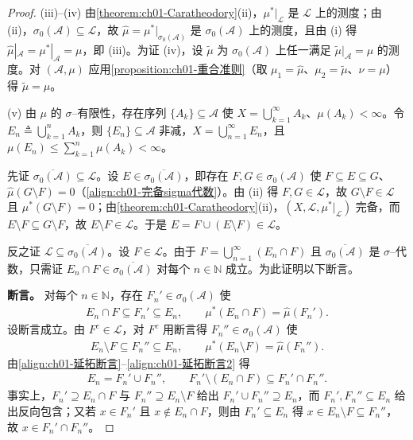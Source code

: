 \documentclass[../../main.tex]{subfiles}%
\begin{document}
\begin{proof}
(iii)--(iv) 由\cref{theorem:ch01-Caratheodory}(ii)，$\mu^*|_{\mathcal{L}}$ 是 $\mathcal{L}$ 上的测度；由 (ii)，$\sigma_0(\mathcal{A})\subseteq\mathcal{L}$，故 $\widehat{\mu}=\mu^*|_{\sigma_0(\mathcal{A})}$ 是 $\sigma_0(\mathcal{A})$ 上的测度，且由 (i) 得 $\widehat{\mu}|_{\mathcal{A}}=\mu^*|_{\mathcal{A}}=\mu$，即 (iii)。为证 (iv)，设 $\widetilde{\mu}$ 为 $\sigma_0(\mathcal{A})$ 上任一满足 $\widetilde{\mu}|_{\mathcal{A}}=\mu$ 的测度。对 $(\mathcal{A},\mu)$ 应用\cref{proposition:ch01-重合准则}（取 $\mu_1=\widehat{\mu}$、$\mu_2=\widetilde{\mu}$、$\nu=\mu$）得 $\widetilde{\mu}=\widehat{\mu}$。

(v) 由 $\mu$ 的 $\sigma$--有限性，存在序列 $\{A_k\}\subseteq\mathcal{A}$ 使 $X=\bigcup_{k=1}^\infty A_k$、$\mu(A_k)<\infty$。令 $E_n\triangleq\bigcup_{k=1}^n A_k$，则 $\{E_n\}\subseteq\mathcal{A}$ 非减，$X=\bigcup_{n=1}^\infty E_n$，且 $\mu(E_n)\leqslant\sum_{k=1}^n\mu(A_k)<\infty$。

先证 $\overline{\sigma_0(\mathcal{A})}\subseteq\mathcal{L}$。设 $E\in\overline{\sigma_0(\mathcal{A})}$，即存在 $F,G\in\sigma_0(\mathcal{A})$ 使 $F\subseteq E\subseteq G$、$\widehat{\mu}(G\setminus F)=0$（\eqref{align:ch01-完备sigma代数}）。由 (ii) 得 $F,G\in\mathcal{L}$，故 $G\setminus F\in\mathcal{L}$ 且 $\mu^*(G\setminus F)=0$；由\cref{theorem:ch01-Caratheodory}(ii)，$(X,\mathcal{L},\mu^*|_{\mathcal{L}})$ 完备，而 $E\setminus F\subseteq G\setminus F$，故 $E\setminus F\in\mathcal{L}$。于是 $E=F\cup(E\setminus F)\in\mathcal{L}$。

反之证 $\mathcal{L}\subseteq\overline{\sigma_0(\mathcal{A})}$。设 $F\in\mathcal{L}$。由于 $F=\bigcup_{n=1}^\infty(E_n\cap F)$ 且 $\overline{\sigma_0(\mathcal{A})}$ 是 $\sigma$--代数，只需证 $E_n\cap F\in\overline{\sigma_0(\mathcal{A})}$ 对每个 $n\in\mathbb{N}$ 成立。为此证明以下断言。

\textbf{断言。} 对每个 $n\in\mathbb{N}$，存在 $F_n'\in\sigma_0(\mathcal{A})$ 使
\begin{align}
E_n\cap F\subseteq F_n'\subseteq E_n,\qquad\mu^*(E_n\cap F)=\widehat{\mu}(F_n').\label{align:ch01-延拓断言}
\end{align}
设断言成立。由 $F^c\in\mathcal{L}$，对 $F^c$ 用断言得 $F_n''\in\sigma_0(\mathcal{A})$ 使
\begin{align}
E_n\setminus F\subseteq F_n''\subseteq E_n,\qquad\mu^*(E_n\setminus F)=\widehat{\mu}(F_n'').\label{align:ch01-延拓断言2}
\end{align}
由\eqref{align:ch01-延拓断言}--\eqref{align:ch01-延拓断言2} 得
\begin{align}
E_n=F_n'\cup F_n'',\qquad F_n'\setminus(E_n\cap F)\subseteq F_n'\cap F_n''.\label{align:ch01-延拓断言3}
\end{align}
事实上，$F_n'\supseteq E_n\cap F$ 与 $F_n''\supseteq E_n\setminus F$ 给出 $F_n'\cup F_n''\supseteq E_n$，而 $F_n',F_n''\subseteq E_n$ 给出反向包含；又若 $x\in F_n'$ 且 $x\notin E_n\cap F$，则由 $F_n'\subseteq E_n$ 得 $x\in E_n\setminus F\subseteq F_n''$，故 $x\in F_n'\cap F_n''$。


\end{proof}
\end{document}

